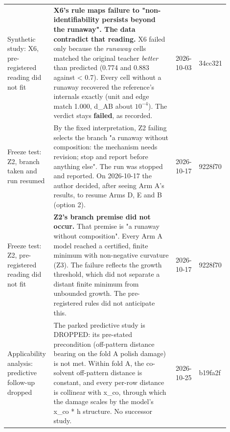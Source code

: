 {\begin{longtable}{R{0.18\linewidth} R{0.54\linewidth} R{0.10\linewidth} R{0.08\linewidth}}
Synthetic study: X6, pre-registered reading did not fit & \textbf{X6's rule maps failure to "non-identifiability persists beyond the runaway". The data contradict that reading.} X6 failed only because the \emph{runaway} cells matched the original teacher \emph{better} than predicted (0.774 and 0.883 against < 0.7). Every cell without a runaway recovered the reference's internals exactly (unit and edge match 1.000, d\_AB about $10^{-4}$). The verdict stays \textbf{failed}, as recorded. & 2026-10-03 & 34cc321 \\
Freeze test: Z2, branch taken and run resumed & By the fixed interpretation, Z2 failing selects the branch "a runaway without composition: the mechanism needs revision; stop and report before anything else". The run was stopped and reported. On 2026-10-17 the author decided, after seeing Arm A's results, to resume Arms D, E and B (option 2). & 2026-10-17 & 9228f70 \\
Freeze test: Z2, pre-registered reading did not fit & \textbf{Z2's branch premise did not occur.} That premise is "a runaway without composition". Every Arm A model reached a certified, finite minimum with non-negative curvature (Z3). The failure reflects the growth threshold, which did not separate a distant finite minimum from unbounded growth. The pre-registered rules did not anticipate this. & 2026-10-17 & 9228f70 \\
Applicability analysis: predictive follow-up dropped & The parked predictive study is DROPPED: its pre-stated precondition (off-pattern distance bearing on the fold A polish damage) is not met. Within fold A, the co-solvent off-pattern distance is constant, and every per-row distance is collinear with x\_co, through which the damage scales by the model's x\_co * h structure. No successor study. & 2026-10-25 & b19fa2f \\
\bottomrule
\end{longtable}}